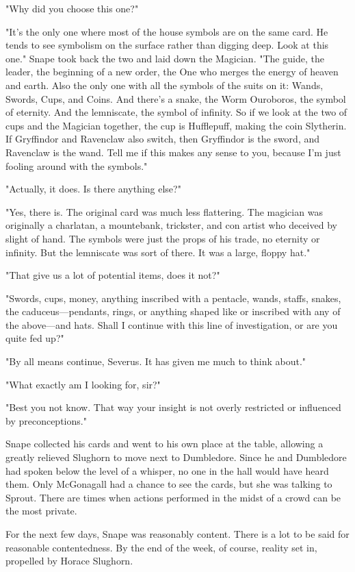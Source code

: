 "Why did you choose this one?"

"It's the only one where most of the house symbols are on the same card. He tends to see symbolism on the surface rather than digging deep. Look at this one." Snape took back the two and laid down the Magician. "The guide, the leader, the beginning of a new order, the One who merges the energy of heaven and earth. Also the only one with all the symbols of the suits on it: Wands, Swords, Cups, and Coins. And there's a snake, the Worm Ouroboros, the symbol of eternity. And the lemniscate, the symbol of infinity. So if we look at the two of cups and the Magician together, the cup is Hufflepuff, making the coin Slytherin. If Gryffindor and Ravenclaw also switch, then Gryffindor is the sword, and Ravenclaw is the wand. Tell me if this makes any sense to you, because I'm just fooling around with the symbols."

"Actually, it does. Is there anything else?"

"Yes, there is. The original card was much less flattering. The magician was originally a charlatan, a mountebank, trickster, and con artist who deceived by slight of hand. The symbols were just the props of his trade, no eternity or infinity. But the lemniscate was sort of there. It was a large, floppy hat."

"That give us a lot of potential items, does it not?"

"Swords, cups, money, anything inscribed with a pentacle, wands, staffs, snakes, the caduceus—pendants, rings, or anything shaped like or inscribed with any of the above—and hats. Shall I continue with this line of investigation, or are you quite fed up?"

"By all means continue, Severus. It has given me much to think about."

"What exactly am I looking for, sir?"

"Best you not know. That way your insight is not overly restricted or influenced by preconceptions."

Snape collected his cards and went to his own place at the table, allowing a greatly relieved Slughorn to move next to Dumbledore. Since he and Dumbledore had spoken below the level of a whisper, no one in the hall would have heard them. Only McGonagall had a chance to see the cards, but she was talking to Sprout. There are times when actions performed in the midst of a crowd can be the most private.

For the next few days, Snape was reasonably content. There is a lot to be said for reasonable contentedness. By the end of the week, of course, reality set in, propelled by Horace Slughorn.

